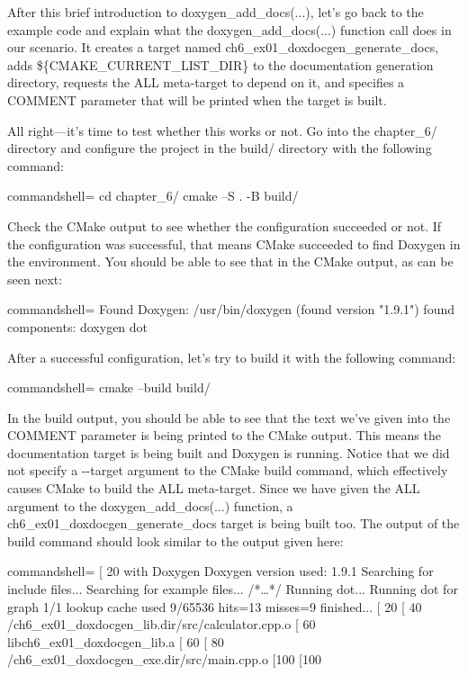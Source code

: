 After this brief introduction to doxygen\_add\_docs(...), let's go back to the example code and explain what the doxygen\_add\_docs(...) function call does in our scenario. It creates a target named ch6\_ex01\_doxdocgen\_generate\_docs, adds \$\{CMAKE\_CURRENT\_LIST\_DIR\} to the documentation generation directory, requests the ALL meta-target to depend on it, and specifies a COMMENT parameter that will be printed when the target is built.

All right—it's time to test whether this works or not. Go into the chapter\_6/ directory and configure the project in the build/ directory with the following command:

\begin{tcblisting}{commandshell={}}
cd chapter_6/
cmake –S . -B build/
\end{tcblisting}

Check the CMake output to see whether the configuration succeeded or not. If the configuration was successful, that means CMake succeeded to find Doxygen in the environment. You should be able to see that in the CMake output, as can be seen next:

\begin{tcblisting}{commandshell={}}
Found Doxygen: /usr/bin/doxygen (found version "1.9.1")
	found components: doxygen dot
\end{tcblisting}

After a successful configuration, let's try to build it with the following command:

\begin{tcblisting}{commandshell={}}
cmake --build build/
\end{tcblisting}

In the build output, you should be able to see that the text we've given into the COMMENT parameter is being printed to the CMake output. This means the documentation target is being built and Doxygen is running. Notice that we did not specify a -{}-target argument to the CMake build command, which effectively causes CMake to build the ALL meta-target. Since we have given the ALL argument to the doxygen\_add\_docs(...) function, a ch6\_ex01\_doxdocgen\_generate\_docs target is being built too. The output of the build command should look similar to the output given here:

\begin{tcblisting}{commandshell={}}
[ 20%
with Doxygen
Doxygen version used: 1.9.1
Searching for include files...
Searching for example files...
/*…*/
Running dot...
Running dot for graph 1/1
lookup cache used 9/65536 hits=13 misses=9
finished...
[ 20%
[ 40%
  /ch6_ex01_doxdocgen_lib.dir/src/calculator.cpp.o
[ 60%
libch6_ex01_doxdocgen_lib.a
[ 60%
[ 80%
  /ch6_ex01_doxdocgen_exe.dir/src/main.cpp.o
[100%
[100%
\end{tcblisting}

